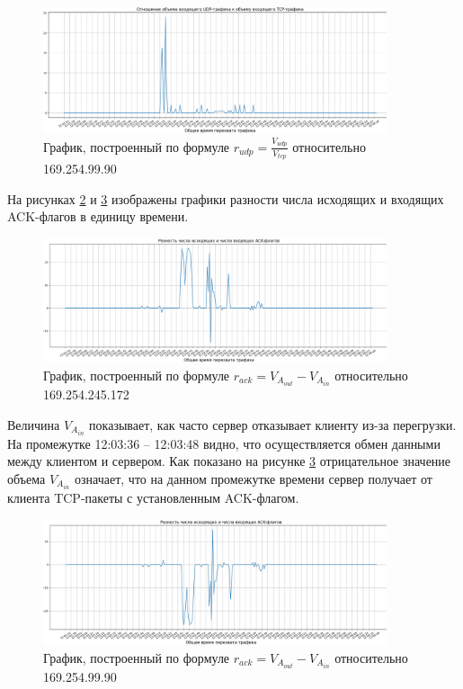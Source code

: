 \documentclass[bachelor, och, coursework]{SCWorks}
\begin{document}
  \begin{figure}[H]
    \centering
    \includegraphics[width=0.9\textwidth]{photo/clnt-2.png}
    \caption{График, построенный по формуле $r_{udp} = \frac{V_{udp}}{V_{tcp}}$ относительно 169.254.99.90}
    \label{clnt2}
  \end{figure}

  На рисунках \ref{serv3} и \ref{clnt3} изображены графики разности числа исходящих и входящих ACK-флагов в единицу времени.

  \begin{figure}[H]
    \centering
    \includegraphics[width=0.9\textwidth]{photo/serv-3.png}
    \caption{График, построенный по формуле $r_{ack} = V_{A_{out}} - V_{A_{in}}$ относительно 169.254.245.172}
    \label{serv3}
  \end{figure}

  Величина $V_{A_{in}}$ показывает, как часто сервер отказывает клиенту из-за перегрузки. На промежутке 12:03:36 -- 12:03:48 видно, что 
  осуществляется обмен данными между клиентом и сервером. Как показано на рисунке \ref{clnt3} отрицательное значение объема $V_{A_{in}}$
  означает, что на данном промежутке времени сервер получает от клиента TCP-пакеты с установленным ACK-флагом. 

  \begin{figure}[H]
    \centering
    \includegraphics[width=0.9\textwidth]{photo/clnt-3.png}
    \caption{График, построенный по формуле $r_{ack} = V_{A_{out}} - V_{A_{in}}$ относительно 169.254.99.90}
    \label{clnt3}
  \end{figure}
\end{document}
